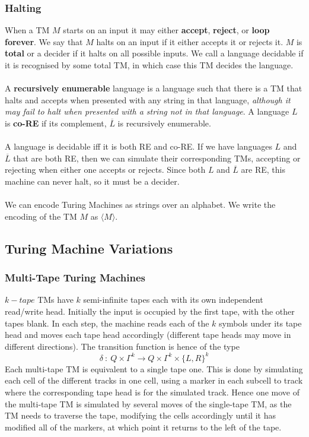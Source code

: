 \documentclass{article}
\newcommand{\encode}[1]{\langle #1 \rangle}
\begin{document}
    \subsubsection{Halting}
        When a TM $M$ starts on an input it may either \textbf{accept}, \textbf{reject}, or \textbf{loop forever}. We say that $M$ halts on an input if it either accepts it or rejects it. $M$ is \textbf{total} or a decider if it halts on all possible inputs. We call a language decidable if it is recognised by some total TM, in which case this TM decides the language. \\ \\
        A \textbf{recursively enumerable} language is a language such that there is a TM that halts and accepts when presented with any string in that language, \textit{although it may fail to halt when presented with a string not in that language}. A language $L$ is \textbf{co-RE} if its complement, $\overline{L}$ is recursively enumerable. \\ \\
        A language is decidable iff it is both RE and co-RE. If we have languages $L$ and $\overline{L}$ that are both RE, then we can simulate their corresponding TMs, accepting or rejecting when either one accepts or rejects. Since both $L$ and $\overline{L}$ are RE, this machine can never halt, so it must be a decider.\\ \\
        We can encode Turing Machines as strings over an alphabet. We write the encoding of the TM $M$ as $\encode{M}$.
    \subsection{Turing Machine Variations}
    \subsubsection{Multi-Tape Turing Machines}
    $k-tape$ TMs have $k$ semi-infinite tapes each with its own independent read/write head. Initially the input is occupied by the first tape, with the other tapes blank. In each step, the machine reads each of the $k$ symbols under its tape head and moves each tape head accordingly (different tape heads may move in different directions). The transition function is hence of the type
    \[ \delta \ : \ Q \times \Gamma^k \to Q \times \Gamma^k \times \{L, R\}^k \]
    Each multi-tape TM is equivalent to a single tape one. This is done by simulating each cell of the different tracks in one cell, using a marker in each subcell to track where the corresponding tape head is for the simulated track. Hence one move of the multi-tape TM is simulated by several moves of the single-tape TM, as the TM needs to traverse the tape, modifying the cells accordingly until it has modified all of the markers, at which point it returns to the left of the tape. 
\end{document}
